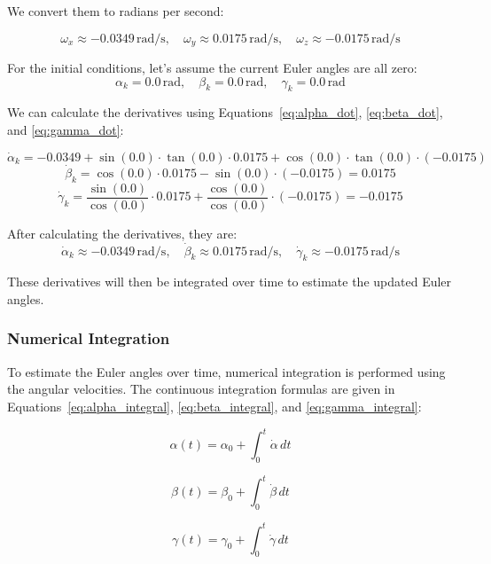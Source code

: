 \documentclass[12pt]{article}
\begin{document}
We convert them to radians per second:

\begin{equation}
\label{eq:rate-gyro-rad}
\omega_x \approx -0.0349 \, \text{rad/s}, \quad \omega_y \approx 0.0175 \, \text{rad/s}, \quad \omega_z \approx -0.0175 \, \text{rad/s}
\end{equation}

For the initial conditions, let's assume the current Euler angles are all zero:
\[
\alpha_k = 0.0 \, \text{rad}, \quad \beta_k = 0.0 \, \text{rad}, \quad \gamma_k = 0.0 \, \text{rad}
\]

We can calculate the derivatives using Equations~\eqref{eq:alpha_dot}, \eqref{eq:beta_dot}, and \eqref{eq:gamma_dot}:

\[
\dot{\alpha}_k = -0.0349 + \sin(0.0) \cdot \tan(0.0) \cdot 0.0175 + \cos(0.0) \cdot \tan(0.0) \cdot (-0.0175)
\]
\[
\dot{\beta}_k = \cos(0.0) \cdot 0.0175 - \sin(0.0) \cdot (-0.0175) = 0.0175
\]
\[
\dot{\gamma}_k = \frac{\sin(0.0)}{\cos(0.0)} \cdot 0.0175 + \frac{\cos(0.0)}{\cos(0.0)} \cdot (-0.0175) = -0.0175
\]

After calculating the derivatives, they are:
\[
\dot{\alpha}_k \approx -0.0349 \, \text{rad/s}, \quad \dot{\beta}_k \approx 0.0175 \, \text{rad/s}, \quad \dot{\gamma}_k \approx -0.0175 \, \text{rad/s}
\]

These derivatives will then be integrated over time to estimate the updated Euler angles.

\subsubsection{Numerical Integration}
To estimate the Euler angles over time, numerical integration is performed using the angular velocities. The continuous integration formulas are given in Equations~\eqref{eq:alpha_integral}, \eqref{eq:beta_integral}, and \eqref{eq:gamma_integral}:

\begin{equation}
\label{eq:alpha_integral}
\alpha(t) = \alpha_0 + \int_0^t \dot{\alpha} \, dt
\end{equation}

\begin{equation}
\label{eq:beta_integral}
\beta(t) = \beta_0 + \int_0^t \dot{\beta} \, dt
\end{equation}

\begin{equation}
\label{eq:gamma_integral}
\gamma(t) = \gamma_0 + \int_0^t \dot{\gamma} \, dt
\end{equation}
\end{document}
